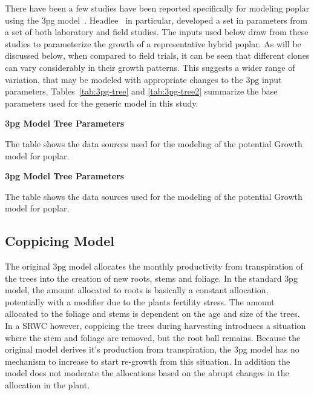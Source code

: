 \documentclass[10pt]{article}
\begin{document}
There have been a few studies have been reported specifically for
modeling poplar using the \ac{3pg}
model~\cite{Amichev2010,Headlee2012}.  Headlee~\cite{Headlee2012} in
particular, developed a set in \pop parameters from a set of both
laboratory and field studies.  The inputs used below draw from these
studies to parameterize the growth of a representative hybrid poplar.
As will be discussed below, when compared to field trials, it can be
seen that different \pop clones can vary considerably in their growth
patterns.  This suggests a wider range of variation, that may be
modeled with appropriate changes to the \ac{3pg} input parameters.
Tables~\ref{tab:3pg-tree} and \ref{tab:3pg-tree2} summarize the base
parameters used for the generic \pop model in this study.

\begin{table}[!ht]
\caption{\textbf{\ac{3pg} Model Tree Parameters}}
%

\begin{flushleft}The table shows the data sources used for the
  modeling of the potential Growth model for poplar.
\end{flushleft}
\label{tab:3pg-tree}
 \end{table}

\begin{table}[!ht]
\caption{\textbf{\ac{3pg} Model Tree Parameters}}
%

\begin{flushleft}The table shows the data sources used for the
  modeling of the potential Growth model for poplar.
\end{flushleft}
\label{tab:3pg-tree2}
 \end{table}

\subsection*{Coppicing Model}
\label{sec:coppicing-model}

The original \ac{3pg} model allocates the monthly productivity from
transpiration of the trees into the creation of new roots, stems and
foliage.  In the standard \ac{3pg} model, the amount allocated to
roots is basically a constant allocation, potentially with a modifier
due to the plants fertility stress. The amount allocated to the
foliage and stems is dependent on the age and size of the trees.  In a
\ac{SRWC} however, coppicing the trees during harvesting introduces a
situation where the stem and foliage are removed, but the root ball
remains.  Because the original model derives it's production from
transpiration, the \ac{3pg} model has no mechanism to increase to
start re-growth from this situation.  In addition the model does not
moderate the allocations based on the abrupt changes in the allocation
in the plant.
\end{document}
